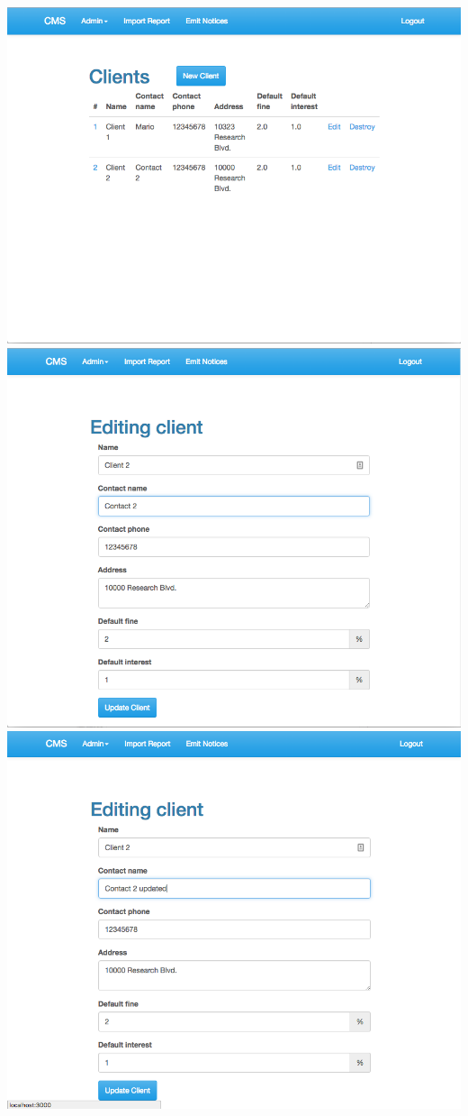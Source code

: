\begin{itemize}
    \includegraphics[scale=0.25]{./images/ss/client/edit/2.png}\\
    \includegraphics[scale=0.25]{./images/ss/client/edit/3.png}
    \includegraphics[scale=0.25]{./images/ss/client/edit/4.png}\\

\end{itemize}

